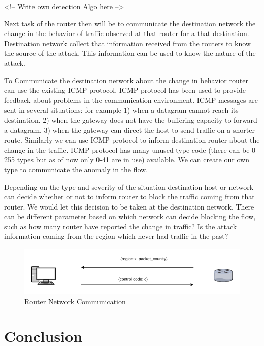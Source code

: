 \documentclass[10pt,oneside,a4paper]{article}
\begin{document}
<!-- Write own detection Algo here -->

Next task of the router then will be to communicate the destination network the change in the behavior of traffic observed at that router for a that destination. Destination network collect that information received from the routers to know the source of the attack. This information can be used to know the nature of the attack.

To Communicate the destination network about the change in behavior router can use the existing ICMP protocol. ICMP protocol has been used to provide feedback about problems in the communication environment. ICMP messages are sent in several situations:  for example 1) when a datagram cannot reach its destination. 2) when the gateway does not have the buffering capacity to forward a datagram. 3) when the gateway can direct the host to send traffic on a shorter route.\cite{icmp} Similarly we can use ICMP protocol to inform destination router about the change in the traffic. ICMP protocol has many unused type code (there can be 0-255 types but as of now only 0-41 are in use) available. We can create our own type to communicate the anomaly in the flow.

Depending on the type and severity of the situation destination host or network can decide whether or not to inform router to block the traffic coming from that router. We would let this decision to be taken at the destination network. There can be different parameter based on which network can decide blocking the flow, such as how many router have reported the change in traffic? Is the attack information coming from the region which never had traffic in the past?

\begin{figure}[H]
\centering
\includegraphics[scale=0.5]{router-network-communication}
\caption{Router Network Communication} \label{fig:router-network-communication}
\end{figure}


\section{Conclusion}
\end{document}

